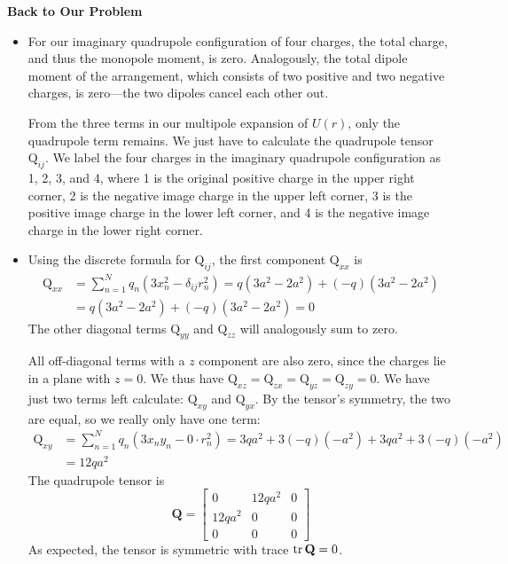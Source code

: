 \documentclass[11pt, a4paper]{article}
\newcommand{\mat}[1]{\mathbf{#1}} %
\begin{document}
\textbf{Back to Our Problem}
\begin{itemize}
	\item For our imaginary quadrupole configuration of four charges, the total charge, and thus the monopole moment, is zero. Analogously, the total dipole moment of the arrangement, which consists of two positive and two negative charges, is zero---the two dipoles cancel each other out. 
	
	From the three terms in our multipole expansion of $ U(r) $, only the quadrupole term remains. We just have to calculate the quadrupole tensor $ \mathrm{Q}_{ij} $. We label the four charges in the imaginary quadrupole configuration as 1, 2, 3, and 4, where 1 is the original positive charge in the upper right corner, 2 is the negative image charge in the upper left corner, 3 is the positive image charge in the lower left corner, and 4 is the negative image charge in the lower right corner. 
	
	\item Using the discrete formula for $ \mathrm{Q}_{ij} $, the first component $ \mathrm{Q}_{xx} $ is 
	\begin{align*}
		\mathrm{Q}_{xx} &= \sum_{n=1}^{N} q_{n} \left(3x_{n}^{2} - \delta_{ij}r_{n}^{2}\right) = q\left(3a^{2} - 2a^{2}\right) +  (-q)\left(3a^{2} - 2a^{2}\right)\\
		&= q\left(3a^{2} - 2a^{2}\right) +  (-q)\left(3a^{2} - 2a^{2}\right) = 0
	\end{align*}
	The other diagonal terms $ \mathrm{Q}_{yy} $ and $ \mathrm{Q}_{zz} $ will analogously sum to zero.
	
	All off-diagonal terms with a $ z $ component are also zero, since the charges lie in a plane with $ z = 0 $. We thus have
	$ \mathrm{Q}_{xz} = \mathrm{Q}_{zx} = \mathrm{Q}_{yz} = \mathrm{Q}_{zy} = 0$. We have just two terms left calculate: $ \mathrm{Q}_{xy} $  and $ \mathrm{Q}_{yx} $. By the tensor's symmetry, the two are equal, so we really only have one term:
	\begin{align*}
		\mathrm{Q}_{xy} &= \sum_{n=1}^{N} q_{n} \left(3x_{n}y_{n} - 0\cdot r_{n}^{2}\right) = 3qa^{2} + 3(-q)(-a^{2}) + 3qa^{2} + 3(-q)(-a^{2})\\
		 &= 12qa^{2}
	\end{align*}
	The quadrupole tensor is
	\begin{equation*}
		\mat{Q} =
		\begin{bmatrix}
			0 & 12q a^{2} & 0\\
			12q a^{2} & 0 & 0\\
			0 & 0 & 0
		\end{bmatrix}
	\end{equation*}
	As expected, the tensor is symmetric with trace $ \tr \mat{Q} = 0 $. 
	

\end{itemize}
\end{document}
